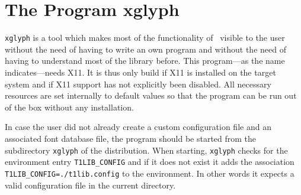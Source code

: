 
\newpage
\section{The Program {\ttfamily xglyph}}
\label{xglyph}%
\verb+xglyph+ is a tool which makes most of the functionality of 
\tonelib\ visible to the user without the need of having to write an
own program and without the need of having to understand most of the
library 
before. This program---as the name indicates---needs X11. It is thus only
build if X11 is installed on the target system and if  X11 support has not
explicitly been disabled. All
necessary resources are set internally to default values so that the
program can be run out of the box without any installation. 

In case the user did not already create a custom configuration file and an
associated font database file, the program should be started from the
subdirectory \verb+xglyph+ of the distribution. When starting, \verb+xglyph+
checks for the environment entry \verb+T1LIB_CONFIG+ and if it does not exist
it adds the association \verb+T1LIB_CONFIG=./t1lib.config+ to the
environment. In other words it expects a valid configuration file in the
current directory.

